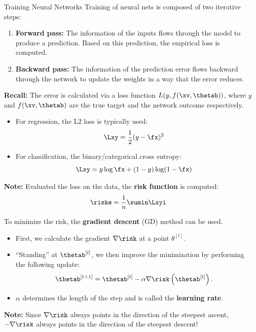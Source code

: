 







\begin{vbframe}{Training Neural Networks}
\lz
Training of neural nets is composed of two iterative steps:
\lz
\begin{enumerate}
\item \textbf{Forward pass:} The information of the inputs flows through the model to produce a prediction. Based on this prediction, the empirical loss is computed.
\lz
\item \textbf{Backward pass:} The information of the prediction error flows backward through the network to update the weights in a way that the error reduces.
\end{enumerate}
\lz

\textbf{Recall:} The error is calculated via a loss function $L(y, f(\xv, \thetab))$, where $y$ and $f(\xv, \thetab)$ are the true target and the network outcome respectively.
\framebreak

\lz
\lz
\begin{itemize}
\item For regression, the L2 loss is typically used:
$$\Lxy = \frac{1}{2}(y - \fx)^2$$
\item For classification, the binary/categorical cross entropy:
$$\Lxy = y \log \fx + (1 - y) \log(1 - \fx)$$
\end{itemize}
\lz
\lz
\textbf{Note:} Evaluated the loss on the data, the \textbf{risk function} is computed:
$$\riske = \frac{1}{n} \sumin \Lxyi$$
\framebreak

\lz
To minimize the risk, the \textbf{gradient descent} (GD) method can be used.
\lz
\begin{itemize}
\item First, we calculate the gradient $\nabla \risk$ at a point $\theta^{[t]}$.
\lz
\item \enquote{Standing} at $\thetab^{[t]}$, we then improve the minimization by performing the following update:
$$\thetab^{[t + 1 ]}  = \thetab^{[t]} - \alpha \nabla \risk\left(\thetab^{[t]}\right).$$
\item $\alpha$ determines the length of the step and is called the \textbf{learning rate}.
\end{itemize}
\lz
\lz
\textbf{Note:} Since $\nabla \risk$ always points in the direction of the steepest ascent, $-\nabla \risk$ always points in the direction of the steepest descent!
\end{vbframe}


